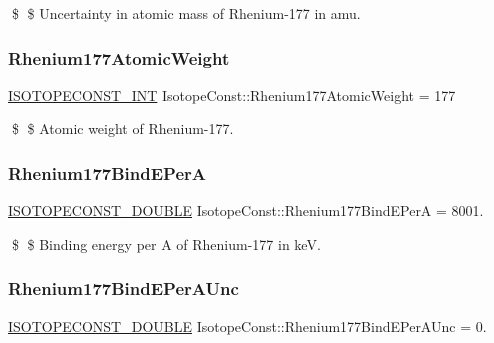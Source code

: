 \$ \$ Uncertainty in atomic mass of Rhenium-\/177 in amu. \mbox{\label{group___isotope_const-_rhenium-_re177_gaebd89e7081f8264dafc57a4dcb7a8db6}} 
\subsubsection{\texorpdfstring{Rhenium177\+Atomic\+Weight}{Rhenium177AtomicWeight}}
{\footnotesize\ttfamily \mbox{\hyperlink{group___isotope_const-_macros_ga5f18360b3e99483a35c32d789e62621c}{I\+S\+O\+T\+O\+P\+E\+C\+O\+N\+S\+T\+\_\+\+I\+NT}} Isotope\+Const\+::\+Rhenium177\+Atomic\+Weight = 177}

\$ \$ Atomic weight of Rhenium-\/177. \mbox{\label{group___isotope_const-_rhenium-_re177_ga2e8ece70ab272e919fc8eff966e0bec2}} 
\subsubsection{\texorpdfstring{Rhenium177\+Bind\+E\+PerA}{Rhenium177BindEPerA}}
{\footnotesize\ttfamily \mbox{\hyperlink{group___isotope_const-_macros_ga8f45a7272ce02c0b4c65c44636ed719a}{I\+S\+O\+T\+O\+P\+E\+C\+O\+N\+S\+T\+\_\+\+D\+O\+U\+B\+LE}} Isotope\+Const\+::\+Rhenium177\+Bind\+E\+PerA = 8001.}

\$ \$ Binding energy per A of Rhenium-\/177 in keV. \mbox{\label{group___isotope_const-_rhenium-_re177_gaaa8db4654a2942ef9fe3fdf0880a6825}} 
\subsubsection{\texorpdfstring{Rhenium177\+Bind\+E\+Per\+A\+Unc}{Rhenium177BindEPerAUnc}}
{\footnotesize\ttfamily \mbox{\hyperlink{group___isotope_const-_macros_ga8f45a7272ce02c0b4c65c44636ed719a}{I\+S\+O\+T\+O\+P\+E\+C\+O\+N\+S\+T\+\_\+\+D\+O\+U\+B\+LE}} Isotope\+Const\+::\+Rhenium177\+Bind\+E\+Per\+A\+Unc = 0.}

